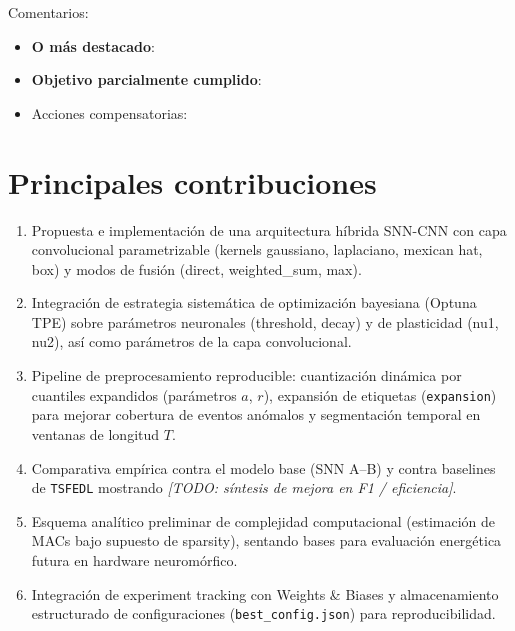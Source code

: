 Comentarios:
\begin{itemize}
    \item \textbf{O más destacado}: %
    \item \textbf{Objetivo parcialmente cumplido}: %
    \item Acciones compensatorias: %
\end{itemize}

\section{Principales contribuciones}
\begin{enumerate}
    \item Propuesta e implementación de una arquitectura híbrida SNN-CNN con capa convolucional parametrizable (kernels gaussiano, laplaciano, mexican hat, box) y modos de fusión (direct, weighted\_sum, max).
    \item Integración de estrategia sistemática de optimización bayesiana (Optuna TPE) sobre parámetros neuronales (threshold, decay) y de plasticidad (nu1, nu2), así como parámetros de la capa convolucional.
    \item Pipeline de preprocesamiento reproducible: cuantización dinámica por cuantiles expandidos (parámetros \(a\), \(r\)), expansión de etiquetas (\texttt{expansion}) para mejorar cobertura de eventos anómalos y segmentación temporal en ventanas de longitud \(T\).
    \item Comparativa empírica contra el modelo base (SNN A--B) y contra baselines de \texttt{TSFEDL} mostrando \textit{[TODO: síntesis de mejora en F1 / eficiencia]}.
    \item Esquema analítico preliminar de complejidad computacional (estimación de MACs bajo supuesto de sparsity), sentando bases para evaluación energética futura en hardware neuromórfico.
    \item Integración de experiment tracking con Weights \& Biases y almacenamiento estructurado de configuraciones (\texttt{best\_config.json}) para reproducibilidad.
\end{enumerate}

